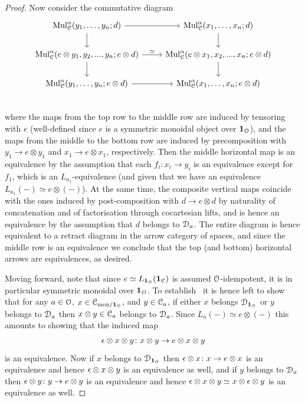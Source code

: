 \begin{proof}
Now consider the commutative diagram
\[
\begin{tikzcd}
\Mul^{\alp}_{\C}(y_1,\dots,y_n;d) \ar[r]\ar[d] & \Mul^{\alp}_{\C}(x_1,\dots,x_n; d) \ar[d] \\
\Mul^{\alp}_{\C}(e \otimes y_1,y_2,...,y_n;e \otimes d) \ar[r,"\simeq"]\ar[d] & \Mul^{\alp}_{\C}(e\otimes x_1,x_2,...,x_n; e\otimes d) \ar[d] \\
\Mul^{\alp}_{\C}(y_1,\dots,y_n;e \otimes d) \ar[r] & \Mul^{\alp}_{\C}(x_1,\dots,x_n; e\otimes d)  \\
\end{tikzcd}
\]
where the maps from the top row to the middle row are induced by tensoring with $e$ (well-defined since $e$ is a symmetric monoidal object over $\mathbf{1}_{\mathcal{O}}$),
and the maps from the middle to the bottom row are induced by precomposition with $y_1 \to e \otimes y_1$ and $x_1 \to e \otimes x_1$, respectively. 
Then the middle horizontal map is an equivalence by the assumption that each $f_i\colon x_i \to y_i$ is an equivalence except for $f_1$, which is an $L_{a_1}$-equivalence (and given that we have an equivalence $L_{a_1}(-) \simeq e \otimes (-)$). At the same time, the composite vertical maps coincide with the ones induced by post-composition with $d \to e \otimes d$ by naturality of concatenation and of factorisation through cocartesian lifts, and is hence an equivalence by the assumption that $d$ belongs to $\mathcal{D}_a$. The entire diagram is hence equivalent to a retract diagram in the arrow category of spaces, and since the middle row is an equivalence we conclude that the top (and bottom) horizontal arrows are equivalences, as desired.

Moving forward, note that since $e \simeq L_{\mathbf{1}_{\mathcal{O}}}(\mathbf{1}_\mathcal C)$ is assumed $\mathcal{O}$-idempotent, it is in particular symmetric monoidal over $\mathbf{1}_{\mathcal{O}}$.
To establish~ it is hence left to show that for any $a \in \mathcal{O}$, $x \in \mathcal C_{\mathrm{mon}/\mathbf{1}_{\mathcal{O}}}$, and $y \in \mathcal C_a$, if either $x$ belongs $\mathcal{D}_{\mathbf{1}_{\mathcal{O}}}$ or $y$ belongs to $\mathcal{D}_{a}$ then $x \otimes y \in \mathcal C_a$ belongs to $\mathcal{D}_a$. Since $L_a(-) \simeq e \otimes (-)$ this amounts to showing that the induced map 
\[
\epsilon\otimes x \otimes y\colon x \otimes y \to e \otimes x \otimes y
\]
is an equivalence. Now if $x$ belongs to $\mathcal{D}_{\mathbf{1}_{\mathcal{O}}}$ then $\epsilon \otimes x \colon x \to e \otimes x$ is an equivalence and hence $\epsilon \otimes x \otimes y$ is an equivalence as well, and if $y$ belongs to $\mathcal{D}_a$ then $\epsilon \otimes y \colon y \to e \otimes y$ is an equivalence and hence $\epsilon \otimes x \otimes y \simeq x \otimes \epsilon \otimes y$ is an equivalence as well. 


\end{proof}
